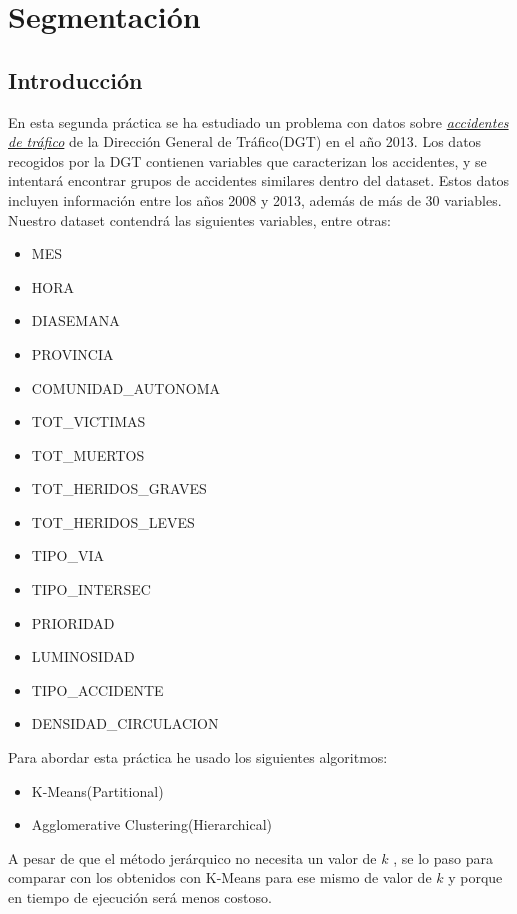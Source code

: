 \section{Segmentación}

\subsection{Introducción}

En esta segunda práctica se ha estudiado un problema con datos sobre  \href{https://sedeapl.dgt.gob.es/WEB_IEST_CONSULTA/subcategoria.faces}{\textit{accidentes de tráfico}} de la Dirección General de Tráfico(DGT) en el año 2013. Los datos recogidos por la DGT contienen variables que caracterizan los accidentes, y se intentará encontrar grupos de accidentes similares dentro del dataset. Estos datos incluyen información entre los años 2008 y 2013, además de más de 30 variables. Nuestro dataset contendrá las siguientes variables, entre otras:

\begin{itemize}
\item MES
\item HORA
\item DIASEMANA
\item PROVINCIA
\item COMUNIDAD\_AUTONOMA
\item TOT\_VICTIMAS
\item TOT\_MUERTOS
\item TOT\_HERIDOS\_GRAVES
\item TOT\_HERIDOS\_LEVES
\item TIPO\_VIA
\item TIPO\_INTERSEC
\item PRIORIDAD
\item LUMINOSIDAD
\item TIPO\_ACCIDENTE
\item DENSIDAD\_CIRCULACION
\end{itemize}

Para abordar esta práctica he usado los siguientes algoritmos:

\begin{itemize}
\item K-Means(Partitional)
\item Agglomerative Clustering(Hierarchical)
\end{itemize}

A pesar de que el método jerárquico no necesita un valor de $k$ , se lo paso para comparar con los obtenidos con K-Means para ese mismo de valor de $k$ y porque en tiempo de ejecución será menos costoso.

